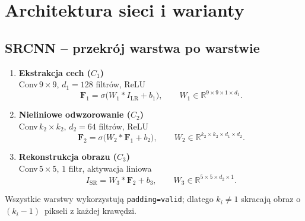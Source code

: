 \documentclass[11pt]{article}
\begin{document}


\section{Architektura sieci i warianty}
\label{sec:model}

\subsection{SRCNN – przekrój warstwa po warstwie}

\begin{enumerate}
  \item \textbf{Ekstrakcja cech (\(C_1\))}\\
        Conv$\,9\times9$, $d_1=128$ filtrów,\; ReLU  
        \[
          \mathbf F_1 = \sigma\!\bigl(W_1 * I_\mathrm{LR}+b_1\bigr),
        \qquad
          W_1\in\mathbb R^{9\times 9\times 1\times d_1}.
        \]
  \item \textbf{Nieliniowe odwzorowanie (\(C_2\))}\\
        Conv$\,k_2\times k_2$, $d_2=64$ filtrów,\; ReLU
        \[
          \mathbf F_2 = \sigma\!\bigl(W_2 * \mathbf F_1 + b_2\bigr),
          \qquad
          W_2\in\mathbb R^{k_2\times k_2\times d_1\times d_2}.
        \]
  \item \textbf{Rekonstrukcja obrazu (\(C_3\))}\\
        Conv$\,5\times5$, $1$ filtr, aktywacja liniowa
        \[
          I_\mathrm{SR}= W_3 * \mathbf F_2 + b_3,
          \qquad
          W_3\in\mathbb R^{5\times 5\times d_2\times 1}.
        \]
\end{enumerate}

Wszystkie warstwy wykorzystują \texttt{padding=valid};
dlatego \(k_i\neq1\) skracają obraz o \((k_i-1)\)~pikseli z każdej
krawędzi.  

\end{document}
